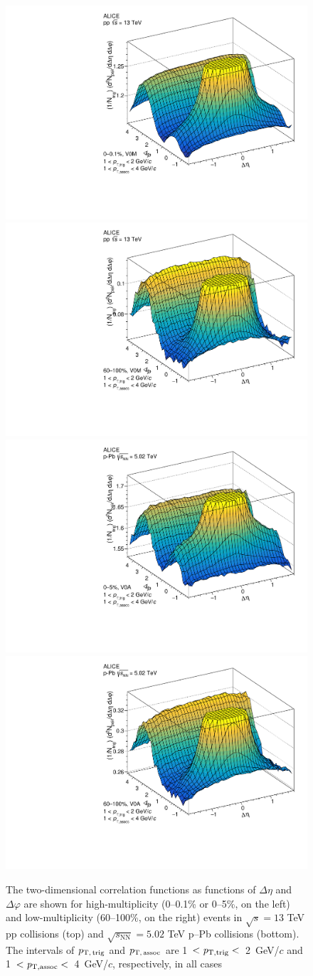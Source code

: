 \begin{figure}[h!]
		\includegraphics[width=0.5 \textwidth]{figures/Fig1_ppHigh.pdf} 
		\includegraphics[width=0.5 \textwidth]{figures/Fig1_ppLow.pdf} 
  		\includegraphics[width=0.5 \textwidth]{figures/Fig1_pPbHigh.pdf}
		\includegraphics[width=0.5 \textwidth]{figures/Fig1_pPbLow.pdf}
\caption{The two-dimensional correlation functions as functions of $\Delta\eta$ and $\Delta\varphi$ are shown for high-multiplicity (0--0.1\% or 0--5\%, on the left) and low-multiplicity (60--100\%, on the right) events in $\sqrt{s}=13$ TeV pp collisions (top) and $\sqrt{s_{\mathrm{NN}}}=5.02$ TeV p--Pb collisions (bottom). The intervals of $p_\mathrm{T,\,trig}$ and $p_\mathrm{T,\,assoc}$ are 1~$<\it{p}_{\rm{T,trig}}<$~2~GeV/$c$ and 1~$<\it{p}_{\rm{T,assoc}}<$~4~GeV/$c$, respectively, in all cases}
\label{fig:doubleridge}
\end{figure}

